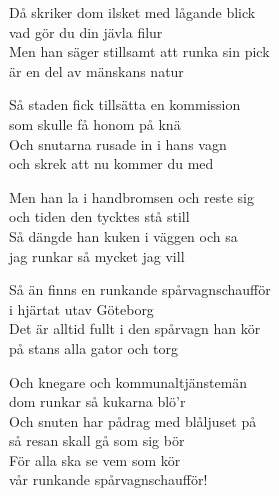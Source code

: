 \vspace{10pt}
Då skriker dom ilsket med lågande blick\\
vad gör du din jävla filur\\
Men han säger stillsamt att runka sin pick\\
är en del av mänskans natur\par
\vspace{10pt}
Så staden fick tillsätta en kommission\\
som skulle få honom på knä\\
Och snutarna rusade in i hans vagn\\
och skrek att nu kommer du med\par
\vspace{10pt}
Men han la i handbromsen och reste sig\\
och tiden den tycktes stå still\\
Så dängde han kuken i väggen och sa\\
jag runkar så mycket jag vill\par
\vspace{10pt}
Så än finns en runkande spårvagnschaufför\\
i hjärtat utav Göteborg\\
Det är alltid fullt i den spårvagn han kör\\
på stans alla gator och torg\par
\vspace{10pt}
Och knegare och kommunaltjänstemän\\
dom runkar så kukarna blö’r \\
Och snuten har pådrag med blåljuset på\\
så resan skall gå som sig bör\\
För alla ska se vem som kör\\
vår runkande spårvagnschaufför!
